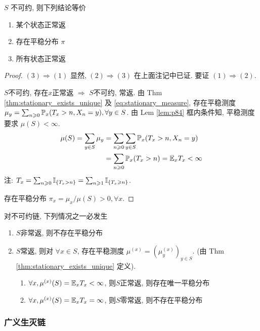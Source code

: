 \begin{theorem}
    $S$ 不可约, 则下列结论等价
    \begin{enumerate}
        \item 某个状态正常返
        \item 存在平稳分布 $\pi$
        \item 所有状态正常返
    \end{enumerate}
\end{theorem}

\begin{proof}
    $(3)\Rightarrow (1)$ 显然, $(2)\Rightarrow (3)$ 在上面注记中已证. 要证 $(1)\Rightarrow (2)$.

    $S$不可约, 存在$x$正常返 $\Rightarrow$ $S$不可约, 常返. 由 Thm \ref{thm:stationary_exists_unique} 及 \eqref{eq:stationary_measure}, 存在平稳测度 $\mu_y=\sum_{n\geqslant 0}\mathbb{P}_x(T_x>n,X_n=y),\forall y\in S$. 由 Lem \ref{lem:p84} 框内条件知, 平稳测度要求 $\mu(S)<\infty$.
    \[
    \begin{aligned}
        \mu(S) = \sum_{y\in S}\mu_y
        &=\sum_{n\geqslant 0}\sum_{y\in S}\mathbb{P}_x(T_x>n,X_n=y)\\
        &=\sum_{n\geqslant 0}\mathbb{P}_x(T_x>n)=\mathbb E_x T_x<\infty
    \end{aligned}
    \]
    注: $T_x=\sum_{n\geqslant 0}\mathbb I_{\{T_x>n\}}=\sum_{n\geqslant 1}\mathbb I_{\{T_x\geqslant n\}}$.

    存在平稳分布 $\pi_x=\mu_x/\mu(S)>0,\forall x$.
\end{proof}

\begin{corollary}
    对不可约链, 下列情况之一必发生
    \begin{enumerate}
        \item $S$非常返, 则不存在平稳分布
        \item $S$常返, 则对 $\forall x\in S$, 存在平稳测度 $\mu^{(x)}=(\mu_y^{(x)})_{y\in S}$. (由 Thm \ref{thm:stationary_exists_unique} 定义).
        \begin{enumerate}
            \item $\forall x,\mu^{(x)}(S)=\mathbb E_xT_x<\infty$, 则$S$正常返, 则存在唯一平稳分布
            \item $\forall x,\mu^{(x)}(S)=\mathbb E_xT_x=\infty$, 则$S$零常返, 则不存在平稳分布
        \end{enumerate}
    \end{enumerate}
\end{corollary}

\subsubsection{广义生灭链}

